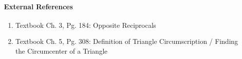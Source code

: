 \documentclass[letterpaper,12pt,twoside]{report}
\begin{document}
	\paragraph{External References}
	
	\begin{enumerate}
		\item Textbook Ch. 3, Pg. 184: Opposite Reciprocals
		\item Textbook Ch. 5, Pg. 308: Definition of Triangle Circumscription / Finding the Circumcenter of a Triangle
		
		
	\end{enumerate}
	
\end{document}
